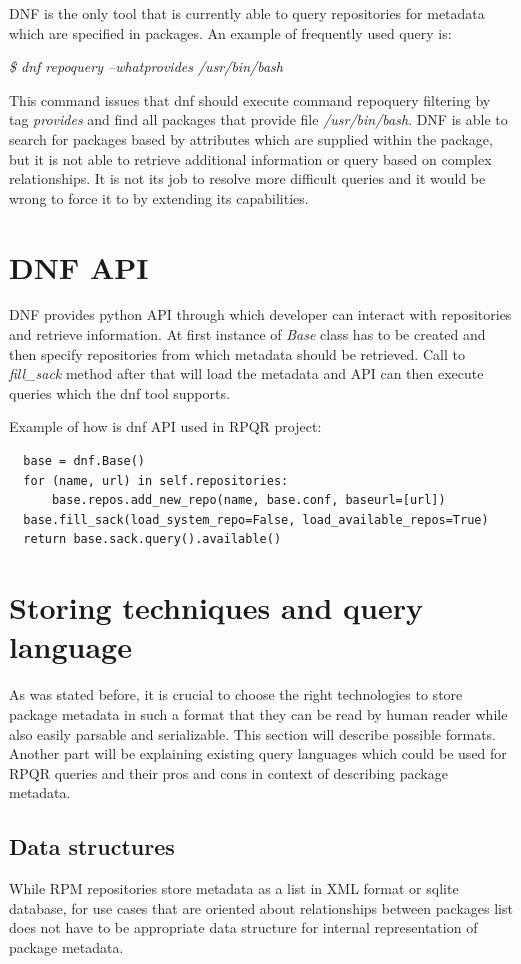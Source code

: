 DNF is the only tool that is currently able to query repositories for metadata which are specified
in packages. An example of frequently used query is:

\textit{\$ dnf repoquery --whatprovides /usr/bin/bash}

This command issues that dnf should execute command repoquery filtering by tag \mbox{\textit{provides}}
and find all packages that provide file \textit{/usr/bin/bash}. DNF is able to search for packages based by
attributes which are supplied within the package, but it is not able to retrieve additional information
or query based on complex relationships. It is not its job to resolve more difficult queries and
it would be wrong to force it to by extending its capabilities.

\section{DNF API}
DNF provides python API through which developer can interact with repositories and retrieve information.
At first instance of \textit{Base} class has to be created and then specify repositories from which
metadata should be retrieved. Call to \textit{fill\_sack} method after that will load the metadata
and API can then execute queries which the dnf tool supports.

Example of how is dnf API used in RPQR project:
\begin{lstlisting}
  base = dnf.Base()
  for (name, url) in self.repositories:
      base.repos.add_new_repo(name, base.conf, baseurl=[url])
  base.fill_sack(load_system_repo=False, load_available_repos=True)
  return base.sack.query().available()
\end{lstlisting}

\section{Storing techniques and query language}
As was stated before, it is crucial to choose the right technologies to store package metadata in
such a format that they can be read by human reader while also easily parsable and serializable.
This section will describe possible formats. Another part will be explaining existing query
languages which could be used for RPQR queries and their pros and cons in context of describing
package metadata.

\subsection*{Data structures}
While RPM repositories store metadata as a list in XML format or sqlite database, for use cases that
are oriented about relationships between packages list does not have to be appropriate data
structure for internal representation of package metadata.

